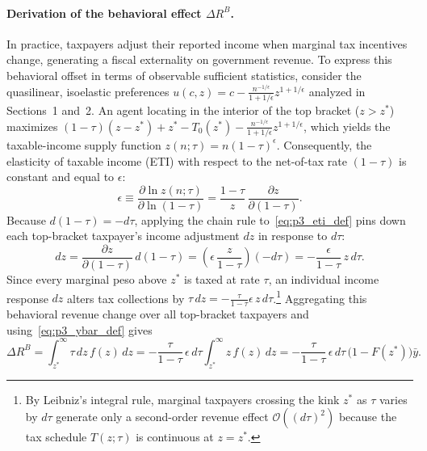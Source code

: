 \paragraph{Derivation of the behavioral effect $\Delta R^B$.}
In practice, taxpayers adjust their reported income when marginal tax incentives change, generating a fiscal externality on government revenue. To express this behavioral offset in terms of observable sufficient statistics, consider the quasilinear, isoelastic preferences $u(c,z) = c - \frac{n^{-1/\epsilon}}{1+1/\epsilon}z^{1+1/\epsilon}$ analyzed in Sections~1 and~2. An agent locating in the interior of the top bracket ($z > z^*$) maximizes $(1-\tau)(z - z^*) + z^* - T_0(z^*) - \frac{n^{-1/\epsilon}}{1+1/\epsilon}z^{1+1/\epsilon}$, which yields the taxable-income supply function $z(n; \tau) = n(1-\tau)^\epsilon$. Consequently, the elasticity of taxable income (ETI) with respect to the net-of-tax rate $(1-\tau)$ is constant and equal to $\epsilon$:
\begin{equation}
\epsilon \equiv \frac{\partial \ln z(n; \tau)}{\partial \ln(1-\tau)} = \frac{1-\tau}{z}\,\frac{\partial z}{\partial(1-\tau)}.
\label{eq:p3_eti_def}
\end{equation}
Because $d(1-\tau) = -d\tau$, applying the chain rule to~\eqref{eq:p3_eti_def} pins down each top-bracket taxpayer's income adjustment $dz$ in response to $d\tau$:
\begin{equation}
dz = \frac{\partial z}{\partial(1-\tau)}\,d(1-\tau) = \left(\epsilon\,\frac{z}{1-\tau}\right)(-d\tau) = -\frac{\epsilon}{1-\tau}\,z\,d\tau.
\label{eq:p3_dz}
\end{equation}
Since every marginal peso above $z^*$ is taxed at rate $\tau$, an individual income response $dz$ alters tax collections by $\tau\,dz = -\frac{\tau}{1-\tau}\epsilon\,z\,d\tau$.\footnote{By Leibniz's integral rule, marginal taxpayers crossing the kink $z^*$ as $\tau$ varies by $d\tau$ generate only a second-order revenue effect $\mathcal{O}((d\tau)^2)$ because the tax schedule $T(z;\tau)$ is continuous at $z = z^*$.} Aggregating this behavioral revenue change over all top-bracket taxpayers and using~\eqref{eq:p3_ybar_def} gives
\begin{equation}
\Delta R^B = \int_{z^*}^\infty \tau\,dz\,f(z)\,dz
= -\frac{\tau}{1-\tau}\,\epsilon\,d\tau \int_{z^*}^\infty z\,f(z)\,dz
= -\frac{\tau}{1-\tau}\,\epsilon\,d\tau\,\big(1 - F(z^*)\big)\bar{y}.
\label{eq:p3_beh_pre_pareto}
\end{equation}

